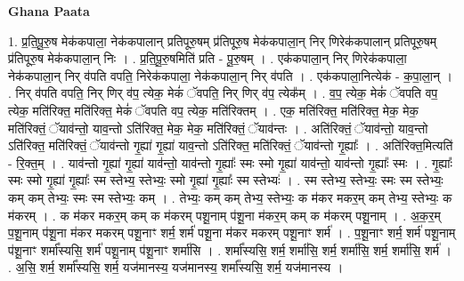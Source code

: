 \documentclass[17pt]{extarticle}
\begin{document}
\textbf{Ghana Paata } \newline

1. प्र॒ति॒पू॒रु॒ष मेक॑कपाला॒ नेक॑कपालान् प्रतिपूरु॒षम् प्र॑तिपूरु॒ष मेक॑कपाला॒न् निर् णिरेक॑कपालान् प्रतिपूरु॒षम् प्र॑तिपूरु॒ष मेक॑कपाला॒न् निः । . प्र॒ति॒पू॒रु॒षमिति॑ प्रति - पू॒रु॒षम् । . एक॑कपाला॒न् निर् णिरेक॑कपाला॒ नेक॑कपाला॒न् निर् व॑पति वपति॒ निरेक॑कपाला॒ नेक॑कपाला॒न् निर् व॑पति । . एक॑कपाला॒नित्येक॑ - क॒पा॒ला॒न् । . निर् व॑पति वपति॒ निर् णिर् व॑प॒ त्येक॒ मेकं॑ ॅवपति॒ निर् णिर् व॑प॒ त्येक᳚म् । . व॒प॒ त्येक॒ मेकं॑ ॅवपति वप॒ त्येक॒ मति॑रिक्त॒ मति॑रिक्त॒ मेकं॑ ॅवपति वप॒ त्येक॒ मति॑रिक्तम् । . एक॒ मति॑रिक्त॒ मति॑रिक्त॒ मेक॒ मेक॒ मति॑रिक्तं॒ ॅयाव॑न्तो॒ याव॒न्तो ऽति॑रिक्त॒ मेक॒ मेक॒ मति॑रिक्तं॒ ॅयाव॑न्तः । . अति॑रिक्तं॒ ॅयाव॑न्तो॒ याव॒न्तो ऽति॑रिक्त॒ मति॑रिक्तं॒ ॅयाव॑न्तो गृ॒ह्या॑ गृ॒ह्या॑ याव॒न्तो ऽति॑रिक्त॒ मति॑रिक्तं॒ ॅयाव॑न्तो गृ॒ह्याः᳚ । . अति॑रिक्त॒मित्यति॑ - रि॒क्त॒म् । . याव॑न्तो गृ॒ह्या॑ गृ॒ह्या॑ याव॑न्तो॒ याव॑न्तो गृ॒ह्याः᳚ स्मः स्मो गृ॒ह्या॑ याव॑न्तो॒ याव॑न्तो गृ॒ह्याः᳚ स्मः । . गृ॒ह्याः᳚ स्मः स्मो गृ॒ह्या॑ गृ॒ह्याः᳚ स्म स्तेभ्य॒ स्तेभ्यः॒ स्मो गृ॒ह्या॑ गृ॒ह्याः᳚ स्म स्तेभ्यः॑ । . स्म स्तेभ्य॒ स्तेभ्यः॒ स्मः स्म स्तेभ्यः॒ कम् कम् तेभ्यः॒ स्मः स्म स्तेभ्यः॒ कम् । . तेभ्यः॒ कम् कम् तेभ्य॒ स्तेभ्यः॒ क म॑कर मकर॒म् कम् तेभ्य॒ स्तेभ्यः॒ क म॑करम् । . क म॑कर मकर॒म् कम् क म॑करम् पशू॒नाम् प॑शू॒ना म॑कर॒म् कम् क म॑करम् पशू॒नाम् । . अ॒क॒र॒म् प॒शू॒नाम् प॑शू॒ना म॑कर मकरम् पशू॒नाꣳ शर्म॒ शर्म॑ पशू॒ना म॑कर मकरम् पशू॒नाꣳ शर्म॑ । . प॒शू॒नाꣳ शर्म॒ शर्म॑ पशू॒नाम् प॑शू॒नाꣳ शर्मा᳚स्यसि॒ शर्म॑ पशू॒नाम् प॑शू॒नाꣳ शर्मा॑सि । . शर्मा᳚स्यसि॒ शर्म॒ शर्मा॑सि॒ शर्म॒ शर्मा॑सि॒ शर्म॒ शर्मा॑सि॒ शर्म॑ । . अ॒सि॒ शर्म॒ शर्मा᳚स्यसि॒ शर्म॒ यज॑मानस्य॒ यज॑मानस्य॒ शर्मा᳚स्यसि॒ शर्म॒ यज॑मानस्य । \newline
\end{document}
